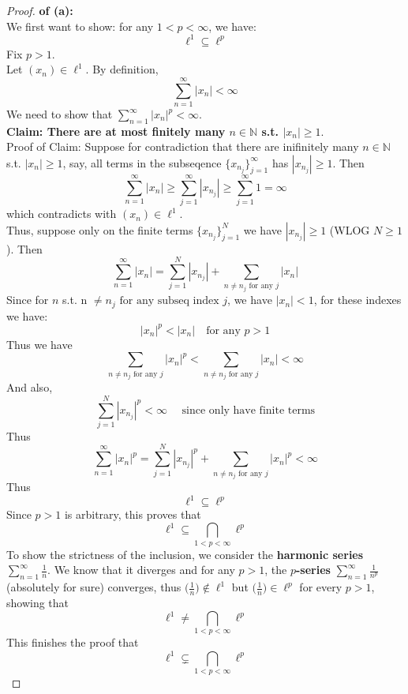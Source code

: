 \documentclass[lang=cn,11pt]{elegantbook}
\begin{document}
\begin{proof}
    \textbf{of (a):}\\
We first want to show: for any \(1 < p < \infty\), we have: \[
\ell^1 \subseteq \ell^p
\]
Fix $p>1$.\\
Let \((x_n) \in \ell^1\). By definition, 
\[
  \sum_{n=1}^{\infty} |x_n| < \infty
\]
We need to show that \(\sum_{n=1}^\infty |x_n|^p < \infty\).\\
\textbf{Claim: There are at most finitely many $n\in \mathbb{N}$ s.t. $|x_n| \geq 1$}.\\
Proof of Claim: Suppose for contradiction that there are inifinitely many $n\in \mathbb{N}$ s.t. $|x_n| \geq 1$, say, all terms in the subseqence $\{x_{n_j}\}_{j=1}^\infty$ has $|x_{n_j}|\geq 1$. Then \[
\sum_{n=1}^{\infty} |x_n| \geq \sum_{j=1}^{\infty} |x_{n_j}|\geq \sum_{j=1}^{\infty} 1 = \infty
\]which contradicts with \((x_n) \in \ell^1\).\\
Thus, suppose only on the finite terms $\{x_{n_j}\}_{j=1}^N$ we have $|x_{n_j}|\geq 1$ (WLOG $N\geq 1$). Then
\[
\sum_{n=1}^{\infty} |x_n| =\sum_{j=1}^{N} |x_{n_j}| + \sum_{n \not = n_j \text{ for any }j} |x_n|
\]
Since for $n$ s.t. n $\not = n_j \text{ for any subseq index }j$, we have $|x_n| <1$, for these indexes we have: \[
|x_n|^p < |x_n| \quad \text{for any } p >1
\] Thus we have \[
\sum_{n \not = n_j \text{ for any }j} |x_n|^p  < \sum_{n \not = n_j \text{ for any }j} |x_n| < \infty
\]
And also, \[
\sum_{j=1}^{N} |x_{n_j}|^p < \infty \quad \text{ since only have finite terms}
\]
Thus \[
\sum_{n=1}^{\infty} |x_n|^p =\sum_{j=1}^{N} |x_{n_j}|^p + \sum_{n \not = n_j \text{ for any }j} |x_n|^p < \infty
\]
Thus \[
\ell^1 \subseteq \ell^p
\]
Since $p>1$ is arbitrary, this proves that
\[
   \ell^1 \subseteq \bigcap_{1<p<\infty}\ell^p
\]
To show the strictness of the inclusion, we consider the \textbf{harmonic series} \(\sum_{n=1}^\infty \frac{1}{n}\). We know that it diverges and for any \(p>1\), the \textbf{\(p\)-series} \(\sum_{n=1}^\infty \frac{1}{n^p}\) (absolutely for sure) converges, thus  \(\bigl(\tfrac{1}{n}\bigr) \notin \ell^1\) but \(\bigl(\tfrac{1}{n}\bigr) \in \ell^p\) for every \(p>1\), showing that \[
   \ell^1 \not= \bigcap_{1<p<\infty}\ell^p
\]This finishes the proof that 
\[
   \ell^1 \subsetneq \bigcap_{1<p<\infty}\ell^p
\]
\end{proof}
\end{document}
